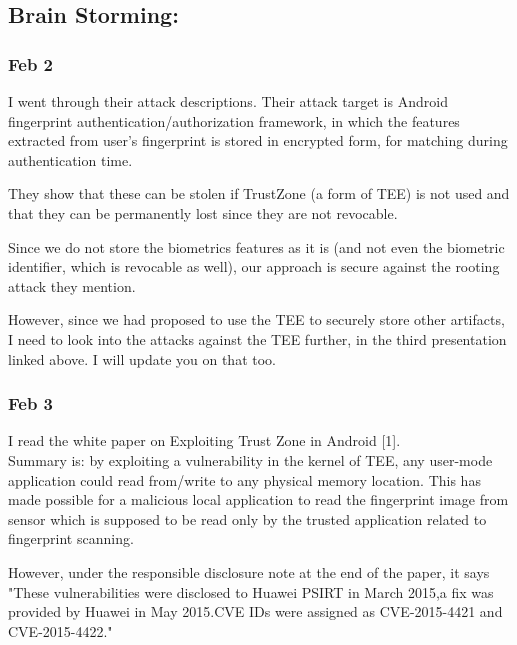 \documentclass[11pt]{article}
\begin{document}
\subsection*{Brain Storming:}

\subsubsection*{Feb 2}
I went through their attack descriptions. Their attack target is Android fingerprint authentication/authorization framework, in which the features 
extracted from user's fingerprint is stored in encrypted form, for matching during authentication time. 

They show that these can be stolen if TrustZone (a form of TEE) is not used and that they can be permanently lost since they are not revocable.

Since we do not store the biometrics features as it is (and not even the biometric identifier, which is revocable as well), our approach is secure 
against the rooting attack they mention.

However, since we had proposed to use the TEE to securely store other artifacts, I need to look into the attacks against the TEE further, in the 
third 
presentation linked above. I will update you on that too.

\subsubsection*{Feb 3}
I read the white paper on Exploiting Trust Zone in Android [1].\\
Summary is: by exploiting a vulnerability in the kernel of TEE, any user-mode application could read from/write to any physical memory location. This 
has made possible for a malicious local application to read the fingerprint image from sensor which is supposed to be read only by the trusted 
application related to fingerprint scanning.

However, under the responsible disclosure note at the end of the paper, it says "These vulnerabilities were disclosed to Huawei PSIRT in March 2015,a 
fix was provided by Huawei in May 2015.CVE IDs were assigned as CVE-2015-4421 and CVE-2015-4422."
\end{document}
